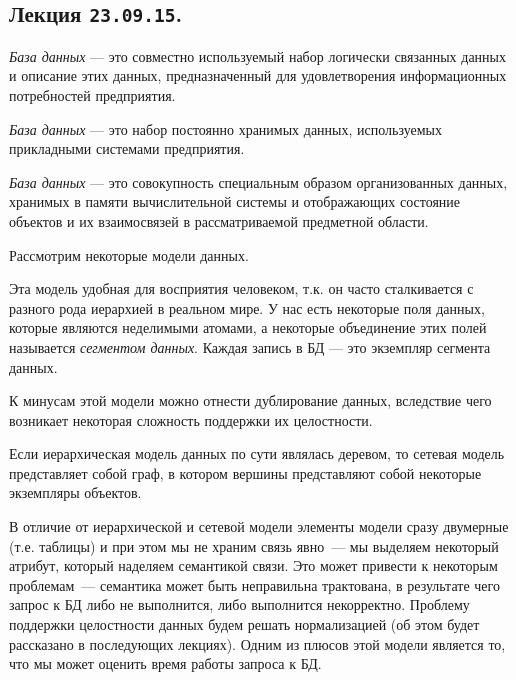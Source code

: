 \subsection{%
  Лекция \texttt{23.09.15}.%
}

\begin{definition}
  \textit{База данных} --- это совместно используемый набор логически связанных 
  данных и описание этих данных, предназначенный для удовлетворения информационных
  потребностей предприятия.
\end{definition}

\begin{definition}[по Дейту]
  \textit{База данных} --- это набор постоянно хранимых данных, используемых 
  прикладными системами предприятия.
\end{definition}

\begin{definition}[по Хомоненко]
  \textit{База данных} --- это совокупность специальным образом организованных данных,
  хранимых в памяти вычислительной системы и отображающих состояние объектов и
  их взаимосвязей в рассматриваемой предметной области.
\end{definition}

Рассмотрим некоторые модели данных.


Эта модель удобная для восприятия человеком, т.к. он часто сталкивается с
разного рода иерархией в реальном мире. У нас есть некоторые поля данных,
которые являются неделимыми атомами, а некоторые объединение этих полей
называется \textit{сегментом данных}.
Каждая запись в БД --- это экземпляр сегмента данных.

К минусам этой модели можно отнести дублирование данных, вследствие чего
возникает некоторая сложность поддержки их целостности.


Если иерархическая модель данных по сути являлась деревом, то сетевая модель
представляет собой граф, в котором вершины представляют собой некоторые
экземпляры объектов.


В отличие от иерархической и сетевой модели элементы модели сразу двумерные
(т.е. таблицы) и при этом мы не храним связь явно~--- мы выделяем некоторый
атрибут, который наделяем семантикой связи. Это может привести к некоторым
проблемам~--- семантика может быть неправильна трактована, в результате чего
запрос к БД либо не выполнится, либо выполнится некорректно. Проблему поддержки
целостности данных будем решать нормализацией (об этом будет рассказано в
последующих лекциях). Одним из плюсов этой модели является то, что мы может
оценить время работы запроса к БД.

